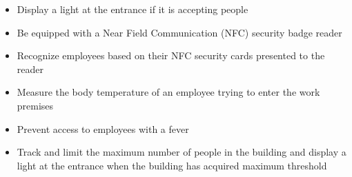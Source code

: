 \begin{itemize}
	\item Display a  light at the entrance if it is accepting people
	\item Be equipped with a Near Field Communication (NFC) security badge
	reader
	\item Recognize employees based on their NFC security cards presented to
	the reader 
	\item Measure the body temperature of an employee trying to enter the work
	premises 
	\item Prevent access to employees with a fever
	\item Track and limit the maximum number of people in the building and display a
	light at the entrance when the building has acquired maximum threshold
\end{itemize}
